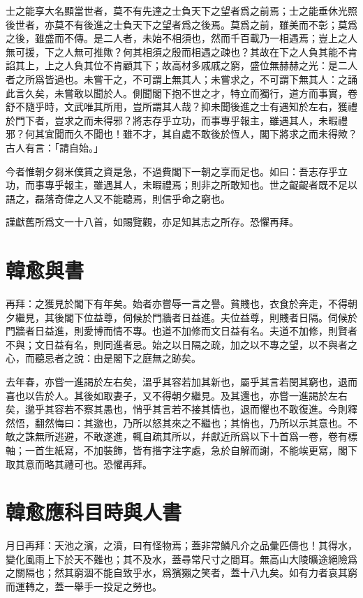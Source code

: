 士之能享大名顯當世者，莫不有先達之士負天下之望者爲之前焉；士之能垂休光照後世者，亦莫不有後進之士負天下之望者爲之後焉。莫爲之前，雖美而不彰；莫爲之後，雖盛而不傳。是二人者，未始不相須也，然而千百載乃一相遇焉；豈上之人無可援，下之人無可推歟？何其相須之殷而相遇之疎也？其故在下之人負其能不肯諂其上，上之人負其位不肯顧其下；故高材多戚戚之窮，盛位無赫赫之光：是二人者之所爲皆過也。未嘗干之，不可謂上無其人；未嘗求之，不可謂下無其人：之誦此言久矣，未嘗敢以聞於人。側聞閣下抱不世之才，特立而獨行，道方而事實，卷舒不隨乎時，文武唯其所用，豈所謂其人哉？抑未聞後進之士有遇知於左右，獲禮於門下者，豈求之而未得邪？將志存乎立功，而事專乎報主，雖遇其人，未暇禮邪？何其宜聞而久不聞也！雖不才，其自處不敢後於恆人，閣下將求之而未得歟？古人有言：「請自始。」

今者惟朝夕芻米僕賃之資是急，不過費閣下一朝之享而足也。如曰：吾志存乎立功，而事專乎報主，雖遇其人，未暇禮焉；則非之所敢知也。世之齪齪者既不足以語之，磊落奇偉之人又不能聽焉，則信乎命之窮也。

謹獻舊所爲文一十八首，如賜覽觀，亦足知其志之所存。恐懼再拜。

\section[與陳給事書\quad{\small 韓愈}]{{\normalsize 韓愈}\quad 與書}
再拜：之獲見於閣下有年矣。始者亦嘗辱一言之譽。貧賤也，衣食於奔走，不得朝夕繼見，其後閣下位益尊，伺候於門牆者日益進。夫位益尊，則賤者日隔。伺候於門牆者日益進，則愛博而情不專。也道不加修而文日益有名。夫道不加修，則賢者不與；文日益有名，則同進者忌。始之以日隔之疏，加之以不專之望，以不與者之心，而聽忌者之說：由是閣下之庭無之跡矣。

去年春，亦嘗一進謁於左右矣，溫乎其容若加其新也，屬乎其言若閔其窮也，退而喜也以告於人。其後如取妻子，又不得朝夕繼見。及其還也，亦嘗一進謁於左右矣，邈乎其容若不察其愚也，悄乎其言若不接其情也，退而懼也不敢復進。今則釋然悟，翻然悔曰：其邈也，乃所以怒其來之不繼也；其悄也，乃所以示其意也。不敏之誅無所逃避，不敢遂進，輒自疏其所以，幷獻近所爲以下十首爲一卷，卷有標軸；一首生紙寫，不加裝飾，皆有揩字注字處，急於自解而謝，不能竢更寫，閣下取其意而略其禮可也。恐懼再拜。

\section[應科目時與人書\quad{\small 韓愈}]{{\normalsize 韓愈}\quad 應科目時與人書}
月日再拜：天池之濱，之濆，曰有怪物焉；蓋非常鱗凡介之品彙匹儔也！其得水，變化風雨上下於天不難也；其不及水，蓋尋常尺寸之間耳。無高山大陵曠途絕險爲之關隔也；然其窮涸不能自致乎水，爲獱獺之笑者，蓋十八九矣。如有力者哀其窮而運轉之，蓋一舉手一投足之勞也。

